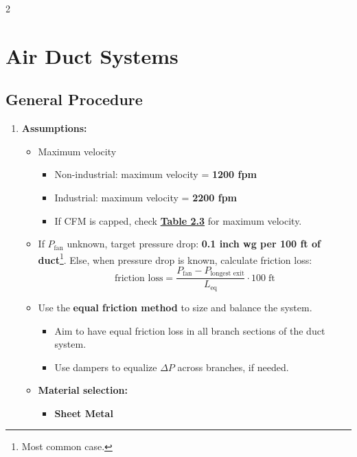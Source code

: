 \begin{multicols*}{2}
    \setcounter{section}{1} %
    \section{Air Duct Systems}
    \subsection{General Procedure}
    \begin{enumerate}
        \item \textbf{Assumptions:}
              \begin{itemize}
                  \item Maximum velocity
                        \begin{itemize}
                            \item Non-industrial: maximum velocity = \textbf{1200 fpm}
                            \item Industrial: maximum velocity = \textbf{2200 fpm}
                            \item If CFM is capped, check \underline{\textbf{Table 2.3}} for maximum velocity.
                        \end{itemize}
                  \item If $P_\text{fan}$ unknown, target pressure drop: \textbf{0.1 inch wg per 100 ft of duct}\footnote{Most common case.}. Else, when pressure drop is known, calculate friction loss:
                        \[\text{friction loss} = \frac{P_\text{fan} - P_\text{longest exit}}{L_{\text{eq}}} \cdot 100 \; \text{ft}\]
                  \item Use the \textbf{equal friction method} to size and balance the system.
                        \begin{itemize}
                            \item Aim to have equal friction loss in all branch sections of the duct system.
                            \item Use dampers to equalize $\Delta P$ across branches, if needed.
                        \end{itemize}
                  \item \textbf{Material selection:}
                        \begin{itemize}
                            \item \textbf{Sheet Metal}
                                  \begin{itemize}

\end{itemize}
\end{itemize}
\end{itemize}
\end{enumerate}
\end{multicols*}
